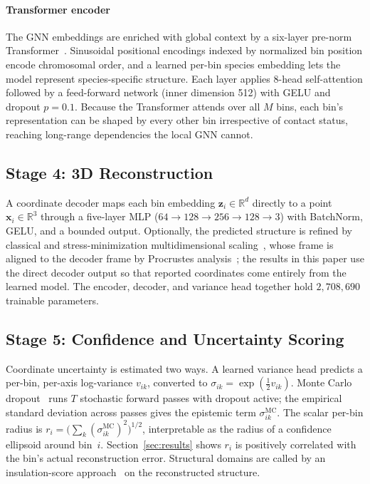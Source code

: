 \documentclass[conference]{IEEEtran}
\begin{document}
\paragraph{Transformer encoder}
The GNN embeddings are enriched with global context by a six-layer pre-norm
Transformer~\cite{vaswani2017}. Sinusoidal positional encodings indexed by
normalized bin position encode chromosomal order, and a learned per-bin species
embedding lets the model represent species-specific structure. Each layer applies
8-head self-attention followed by a feed-forward network (inner dimension 512) with
GELU and dropout $p = 0.1$. Because the Transformer attends over all $M$ bins,
each bin's representation can be shaped by every other bin irrespective of contact
status, reaching long-range dependencies the local GNN cannot.

\subsection{Stage 4: 3D Reconstruction}
A coordinate decoder maps each bin embedding $\mathbf{z}_i \in \mathbb{R}^{d}$
directly to a point $\mathbf{x}_i \in \mathbb{R}^{3}$ through a five-layer MLP
($64 \to 128 \to 256 \to 128 \to 3$) with BatchNorm, GELU, and a bounded output.
Optionally, the predicted structure is refined by classical and
stress-minimization multidimensional scaling~\cite{borg2005}, whose frame is
aligned to the decoder frame by Procrustes analysis~\cite{gower1975}; the results
in this paper use the direct decoder output so that reported coordinates come
entirely from the learned model. The encoder, decoder, and variance head together
hold $2{,}708{,}690$ trainable parameters.

\subsection{Stage 5: Confidence and Uncertainty Scoring}
Coordinate uncertainty is estimated two ways. A learned variance head predicts a
per-bin, per-axis log-variance $v_{ik}$, converted to $\sigma_{ik} =
\exp(\tfrac{1}{2}v_{ik})$. Monte Carlo dropout~\cite{gal2016} runs $T$ stochastic
forward passes with dropout active; the empirical standard deviation across passes
gives the epistemic term $\sigma_{ik}^{\text{MC}}$. The scalar per-bin radius is
$r_i = \big(\sum_k (\sigma_{ik}^{\text{MC}})^2\big)^{1/2}$, interpretable as the
radius of a confidence ellipsoid around bin~$i$. Section~\ref{sec:results} shows
$r_i$ is positively correlated with the bin's actual reconstruction error.
Structural domains are called by an insulation-score
approach~\cite{crane2015} on the reconstructed structure.
\end{document}
